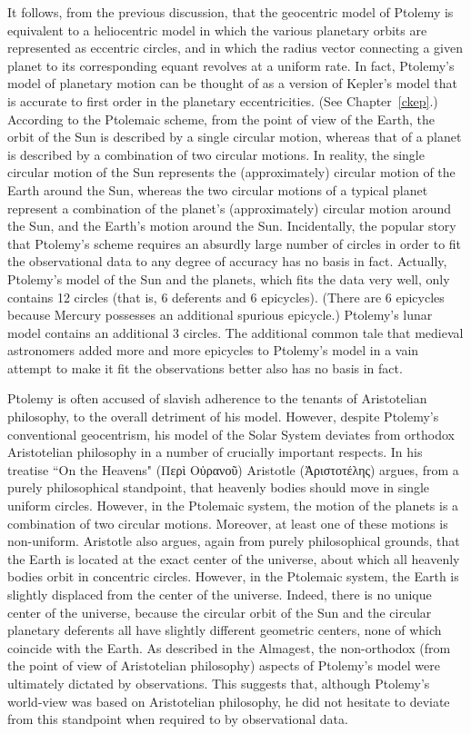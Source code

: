 It follows, from the previous discussion, that the geocentric model of Ptolemy is equivalent to a heliocentric
model in which the various planetary orbits are represented as
eccentric circles, and in which   the radius vector connecting a given planet
to its corresponding equant revolves at a  uniform rate. In fact, Ptolemy's
model of planetary motion can be thought of as a version of Kepler's model that 
is  accurate to  first order in the planetary eccentricities. (See Chapter~\ref{ckep}.)
According to the Ptolemaic scheme, from the point of view of the Earth,
the orbit of the Sun is described by a single circular motion, whereas
that of a planet is described by a combination of  two  circular motions. In reality, the single circular motion of the Sun 
represents the (approximately) circular motion of the Earth around the Sun,
whereas the two circular motions of a typical planet represent a combination of
the planet's (approximately) circular motion around the Sun, and the Earth's
 motion around the Sun. Incidentally, the popular story that Ptolemy's
 scheme requires an absurdly large number of circles in order to
 fit the observational data to any degree of accuracy has no basis in fact. Actually,  Ptolemy's
 model of the Sun  and the planets, which fits the
 data very well, only contains 12 circles (that is, 6 deferents and 6 epicycles). (There are 6 epicycles because Mercury possesses an additional
 spurious epicycle.) Ptolemy's lunar model contains an additional 3 circles. The additional common tale that medieval astronomers added more and more epicycles to Ptolemy's model in a
 vain attempt to make it fit the observations better also has no basis in fact. 

Ptolemy is often accused of slavish adherence to the tenants of  Aristotelian philosophy,
to the overall detriment of his model. However, despite Ptolemy's conventional geocentrism, his model of the Solar System deviates from orthodox 
Aristotelian philosophy in a number of crucially important respects. In his treatise ``On the Heavens"  (Περὶ Οὐρανοῦ)
Aristotle (Ἀριστοτέλης) argues, from a purely philosophical standpoint, that
heavenly bodies should move in  single uniform circles.
However, in the Ptolemaic system, the motion of the planets is
a combination of  two  circular motions. Moreover, at least one
of these motions is non-uniform. Aristotle also argues, again
from purely philosophical grounds, that the Earth is located at the
exact center of the universe, about which all
heavenly bodies orbit in concentric circles.  However, in  the Ptolemaic system, the Earth is slightly displaced from the center of the universe. 
Indeed, there is no unique center of the universe, because the circular orbit
of the Sun and
the circular planetary deferents all have slightly different geometric centers,
none of which coincide with the Earth. As described in the Almagest, the non-orthodox
(from the point of view of Aristotelian philosophy) 
aspects of Ptolemy's model were ultimately dictated by  observations.
This suggests that, although Ptolemy's world-view was based on
Aristotelian philosophy, he did not hesitate to deviate from this standpoint
when required to by observational data.

